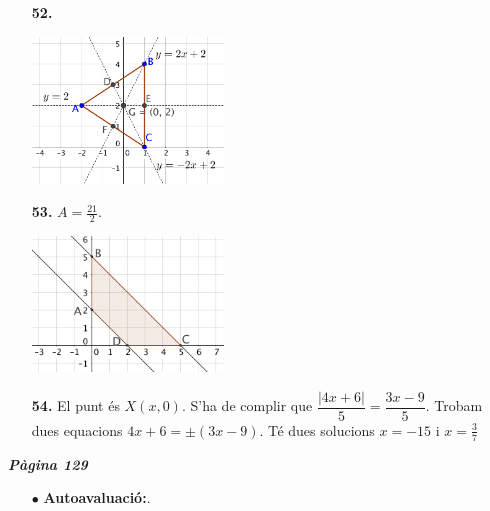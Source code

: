 \documentclass[a4paper, pdf, twoside]{book}
\begin{document}
\begin{multicols}{2}
\begin{enumerate}
\vspace{0.25cm}
\item[\fontfamily{phv}\selectfont\color{blue}\textbf{52. }] 
\mbox {}\par \includegraphics [width=0.4\textwidth ]{img-sol/t9-48}
\vspace{0.25cm}
\item[\fontfamily{phv}\selectfont\color{blue}\textbf{53. }] 
$A=\frac {21}{2}$.\par \includegraphics [width=0.4\textwidth ]{img-sol/t9-trapz}
\vspace{0.25cm}
\item[\fontfamily{phv}\selectfont\color{blue}\textbf{54. }] 
El punt és $X(x,0)$. S'ha de complir que $\dfrac {|4x+6|}{5}=\dfrac {3x-9}{5}$. Trobam dues equacions $4x+6=\pm (3x-9)$. Té dues solucions $x=-15$ i $x=\frac {3}{7}$
 \end{enumerate}
\vspace{0.3cm}


{\textbf{\em Pàgina 129}} \hrulefill
\begin{enumerate}
\vspace{0.25cm}
 \item[$\bullet$ ] {\selectfont\color{blue}\textbf{Autoavaluació:}. }


\end{enumerate}
\end{multicols}
\end{document}
